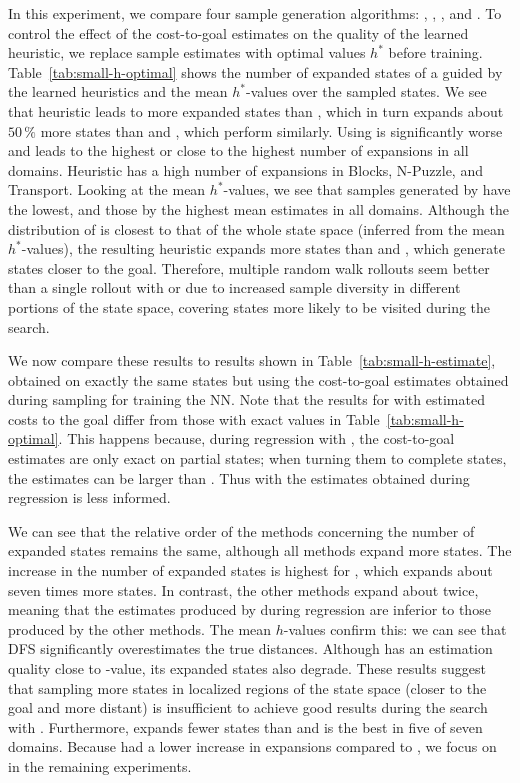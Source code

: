 In this experiment, we compare four sample generation algorithms: \bfs, \dfs, \rw, and \bfsrw. To control the effect of the cost-to-goal estimates on the quality of the learned heuristic, we replace sample estimates with optimal values $h^{*}$ before training. Table~\ref{tab:small-h-optimal} shows the number of expanded states of a \gbfs guided by the learned heuristics and the mean $h^{*}$-values over the sampled states. We see that heuristic \hnnbfs leads to more expanded states than \hnndfs, which in turn expands about $50\,\%$ more states than \hnnrw and \hnnbfsrw, which perform similarly. Using \hnnbfs is significantly worse and leads to the highest or close to the highest number of expansions in all domains. Heuristic \hnndfs has a high number of expansions in Blocks, N-Puzzle, and Transport. Looking at the mean $h^{*}$-values, we see that samples generated by \bfs have the lowest, and those by \dfs the highest mean estimates in all domains. Although the distribution of \dfs is closest to that of the whole state space (inferred from the mean $h^{*}$-values), the resulting heuristic expands more states than \rw and \bfsrw, which generate states closer to the goal. Therefore, multiple random walk rollouts seem better than a single rollout with \bfs or \dfs due to increased sample diversity in different portions of the state space, covering states more likely to be visited during the search.



We now compare these results to results shown in Table~\ref{tab:small-h-estimate}, obtained on exactly the same states but using the cost-to-goal estimates obtained during sampling for training the NN. Note that the results for \bfs with estimated costs to the goal differ from those with exact values in Table~\ref{tab:small-h-optimal}. This happens because, during regression with \bfs, the cost-to-goal estimates are only exact on partial states; when turning them to complete states, the estimates can be larger than \hstar. Thus \hnnbfs with the estimates obtained during regression is less informed.

We can see that the relative order of the methods concerning the number of expanded states remains the same, although all methods expand more states. The increase in the number of expanded states is highest for \hnndfs, which expands about seven times more states. In contrast, the other methods expand about twice, meaning that the estimates produced by \dfs during regression are inferior to those produced by the other methods. The mean $h$-values confirm this: we can see that DFS significantly overestimates the true distances. Although \bfs has an estimation quality close to \hstar-value, its expanded states also degrade. These results suggest that sampling more states in localized regions of the state space (\bfs closer to the goal and \dfs more distant) is insufficient to achieve good results during the search with \gbfs.
Furthermore, \hnnbfsrw expands fewer states than \hnnrw and is the best in five of seven domains. Because \hnnbfsrw had a lower increase in expansions compared to \hnnrw, we focus on \bfsrw in the remaining experiments.

